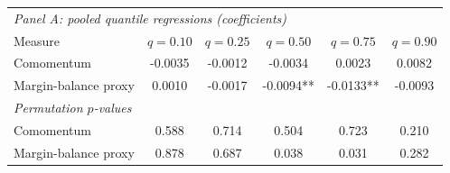 \begingroup\small\setlength{\tabcolsep}{2.5pt}
\begin{tabular}{lccccc}
\toprule
\multicolumn{6}{l}{\textit{Panel A: pooled quantile regressions (coefficients)}} \\
Measure & $q=0.10$ & $q=0.25$ & $q=0.50$ & $q=0.75$ & $q=0.90$ \\
\midrule
Comomentum & -0.0035 & -0.0012 & -0.0034 & 0.0023 & 0.0082 \\
Margin-balance proxy & 0.0010 & -0.0017 & -0.0094** & -0.0133** & -0.0093 \\
\midrule
\multicolumn{6}{l}{\textit{Permutation $p$-values}} \\
Comomentum & 0.588 & 0.714 & 0.504 & 0.723 & 0.210 \\
Margin-balance proxy & 0.878 & 0.687 & 0.038 & 0.031 & 0.282 \\
\bottomrule
\end{tabular}

\endgroup